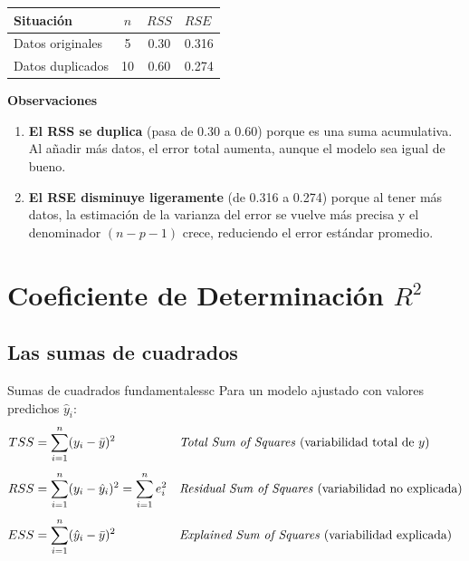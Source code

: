 \documentclass[12pt, a4paper]{article}
\newcommand{\hy}{\hat{y}}
\newcommand{\sumni}{\sum_{i=1}^{n}}
\begin{document}
\begin{center}
\begin{tabular}{lcc}
\toprule
Situación & $n$ & $RSS$ & $RSE$ \\
\midrule
Datos originales & 5 & 0.30 & 0.316 \\
Datos duplicados & 10 & 0.60 & 0.274 \\
\bottomrule
\end{tabular}
\end{center}

\textbf{Observaciones}

\begin{enumerate}
    \item \textbf{El RSS se duplica} (pasa de 0.30 a 0.60) porque es una suma acumulativa. Al añadir más datos, el error total aumenta, aunque el modelo sea igual de bueno.
    \item \textbf{El RSE disminuye ligeramente} (de 0.316 a 0.274) porque al tener más datos, la estimación de la varianza del error se vuelve más precisa y el denominador $(n - p - 1)$ crece, reduciendo el error estándar promedio.
\end{enumerate}



\section{Coeficiente de Determinación $R^2$}

\subsection{Las sumas de cuadrados}

\begin{definicion}{Sumas de cuadrados fundamentales}{sc}
Para un modelo ajustado con valores predichos $\hy_i$:
\begin{align*}
  TSS &= \sumni(y_i - \bar{y})^2
    & &\text{\emph{Total Sum of Squares} (variabilidad total de $y$)}\\[4pt]
  RSS &= \sumni(y_i - \hy_i)^2 = \sumni e_i^2
    & &\text{\emph{Residual Sum of Squares} (variabilidad no explicada)}\\[4pt]
  ESS &= \sumni(\hy_i - \bar{y})^2
    & &\text{\emph{Explained Sum of Squares} (variabilidad explicada)}
\end{align*}
\end{definicion}
\end{document}
